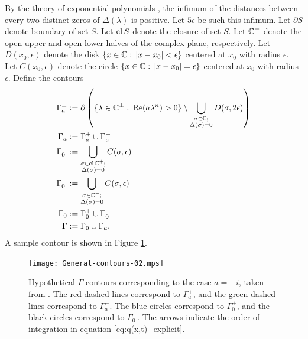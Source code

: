 \documentclass[12pt, oneside, a4paper]{article}
\begin{document}
By the theory of exponential polynomials \cite{Langer1931}, the infimum of the distances between every two distinct zeros of $\Delta(\lambda)$ is positive. Let $5\epsilon$ be such this infimum. Let $\partial S$ denote boundary of set $S$. Let $\operatorname{cl}{S}$ denote the closure of set $S$. Let $\mathbb C^\pm$ denote the open upper and open lower halves of the complex plane, respectively. Let $D(x_0,\epsilon)$ denote the disk $\{x\in\mathbb C:\, |x-x_0|<\epsilon\}$ centered at $x_0$ with radius $\epsilon$. Let $C(x_0,\epsilon)$ denote the circle $\{x\in\mathbb C:\, |x-x_0|=\epsilon\}$ centered at $x_0$ with radius $\epsilon$. Define the contours
\begin{subequations}\label{eq:gamma}
    \begin{align}
        \Gamma_a^{\pm} &:= \partial\left(\{\lambda\in\mathbb C^{\pm}:\, \mathrm{Re}(a\lambda^n)>0\}\setminus \bigcup_{\substack{\sigma\in\mathbb C;\\\Delta(\sigma)=0}} D(\sigma, 2\epsilon)\right)\label{eq:gammaAPlusMinus}\\
        \Gamma_a &:= \Gamma_a^+\cup \Gamma_a^-\\
        \Gamma_0^+ &:= \bigcup_{\substack{\sigma\in\operatorname{cl}\mathbb C^+;\\ \Delta(\sigma)=0}} C(\sigma, \epsilon)\label{eq:gamma0Plus}\\
        \Gamma_0^- &:= \bigcup_{\substack{\sigma\in\mathbb C^-;\\ \Delta(\sigma)=0}} C(\sigma, \epsilon)\label{eq:gamma0Minus}\\
        \Gamma_0 &:= \Gamma_0^+\cup \Gamma_0^-\\
        \Gamma &:= \Gamma_0\cup \Gamma_a.
    \end{align}
\end{subequations}
A sample contour is shown in Figure \ref{fig:gamma_smith_fokas}.

\begin{figure}[htpb!]
    \centering
    \texttt{[image: General-contours-02.mps]}
    \caption{Hypothetical $\Gamma$ contours corresponding to the case $a=-i$, taken from \cite{Smith2016}. The red dashed lines correspond to $\Gamma_a^+$, and the green dashed lines correspond to $\Gamma_a^-$. The blue circles correspond to $\Gamma_0^+$, and the black circles correspond to $\Gamma_0^-$. The arrows indicate the order of integration in equation \eqref{eq:q(x,t)_explicit}.}
    \label{fig:gamma_smith_fokas}
\end{figure}
\end{document}
